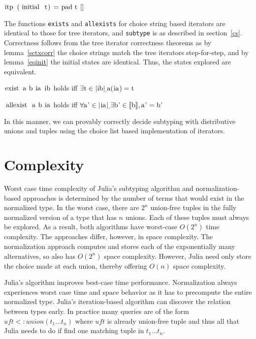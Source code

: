 \documentclass[a4paper,english]{lipics-v2019}
\newcommand{\denotes}[1]{\llbracket #1 \rrbracket}
\renewcommand{\c}[1]{\ensuremath{\text{\lstinline{#1}}}\xspace}
\begin{document}
\begin{lemma}\label{eqinit}
\c{itp (initial t) = pad t []}
\end{lemma}

The functions \verb|exists| and \verb|allexists| for choice string based iterators
are identical to those for tree iterators, and \verb|subtype| is as described in section~\ref{cs}.
Correctness follows from the tree iterator correctness theorems as by lemma~\ref{sctxcorr} 
the choice strings match the tree iterators step-for-step, and by lemma~\ref{eqinit} the initial
states are identical. Thus, the states explored are equivalent.

\begin{theorem}
\c{exist a b ia ib} holds iff $\exists \c t \in \irch{ib}, \c a(\c{ia}) = \c t$
\end{theorem}

\begin{theorem}
\c{allexist a b ia} holds iff $\forall \c{a'} \in \irch{ia}, \exists \c{b'} \in \denotes{\c b}, \c{a'} = \c{b'}$
\end{theorem}

In this manner, we can provably correctly decide subtyping with distributive unions and tuples using
the choice list based implementation of iterators.

\section{Complexity}

Worst case time complexity of Julia's subtyping algorithm and
normalization-based approaches is determined by the number of terms that
would exist in the normalized type. In the worst case, there are $2^n$
union-free tuples in the fully normalized version of a type that has $n$
unions.  Each of these tuples must always be explored. As a result, both
algorithms have worst-case $O(2^n)$ time complexity. The approaches differ,
however, in space complexity. The normalization approach computes and stores
each of the exponentially many alternatives, so also has $O(2^n)$ space
complexity. However, Julia need only store the choice made at each union,
thereby offering $O(n)$ space complexity.

Julia's algorithm improves best-case time performance.  Normalization always
experiences worst case time and space behavior as it has to precompute the
entire normalized type. Julia's iteration-based algorithm can discover the
relation between types early. In practice many queries are of the form
$\mathit{uft} <: union(t_1...t_n)$ where $\mathit{uft}$ is already
union-free tuple and thus all that Julia needs to do if find one matching
tuple in $t_1 ... t_n$.
\end{document}
